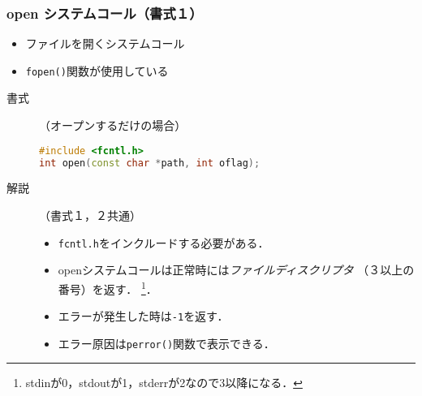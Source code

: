 \documentclass{beamer}                 %
\begin{document}
\begin{frame}[fragile]
  \frametitle{open システムコール（書式１）}
  \begin{itemize}
  \item ファイルを開くシステムコール
  \item \texttt{fopen()}関数が使用している
  \end{itemize}

\begin{description}

\item[書式]（オープンするだけの場合）
\begin{lstlisting}[language=C++]
#include <fcntl.h>
int open(const char *path, int oflag);
\end{lstlisting}

\item[解説]（書式１，２共通）
\begin{itemize}
\item \texttt{fcntl.h}をインクルードする必要がある．
\item openシステムコールは正常時には\emph{ファイルディスクリプタ}
  （３以上の番号）を返す．
\footnote{stdinが0，stdoutが1，stderrが2なので3以降になる．}．
\item エラーが発生した時は\texttt{-1}を返す．
\item エラー原因は\texttt{perror()}関数で表示できる．
\end{itemize}

\end{description}
\end{frame}
\end{document}
